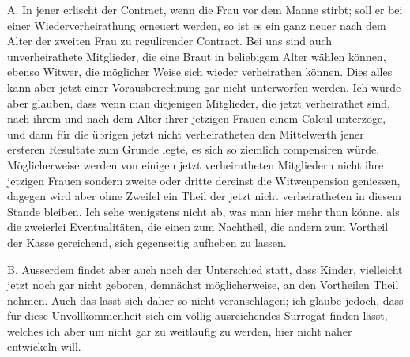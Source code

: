 A. In jener erlischt der Contract, wenn die Frau vor dem Manne stirbt; soll er bei einer Wiederverheirathung erneuert werden, so ist es ein ganz neuer nach dem Alter der zweiten Frau zu regulirender Contract. Bei uns sind auch unverheirathete Mitglieder, die eine Braut in beliebigem Alter wählen können, ebenso Witwer, die möglicher Weise sich wieder verheirathen können. Dies alles kann aber jetzt einer Vorausberechnung gar nicht unterworfen werden. Ich würde aber glauben, dass wenn man diejenigen Mitglieder, die jetzt verheirathet sind, nach ihrem und nach dem Alter ihrer jetzigen Frauen einem Calcül unterzöge, und dann für die übrigen jetzt nicht verheiratheten den Mittelwerth jener ersteren Resultate zum Grunde legte, es sich so ziemlich compensiren würde. Möglicherweise werden von einigen jetzt verheiratheten Mitgliedern nicht ihre jetzigen Frauen sondern zweite oder dritte dereinst die Witwenpension geniessen, dagegen wird aber ohne Zweifel ein Theil der jetzt nicht verheiratheten in diesem Stande bleiben. Ich sehe wenigstens nicht ab, was man hier mehr thun könne, als die zweierlei Eventualitäten, die einen zum Nachtheil, die andern zum Vortheil der Kasse gereichend, sich gegenseitig aufheben zu lassen.

B. Ausserdem findet aber auch noch der Unterschied statt, dass Kinder, vielleicht jetzt noch gar nicht geboren, demnächst möglicherweise, an den Vortheilen Theil nehmen. Auch das lässt sich daher so nicht veranschlagen; ich glaube jedoch, dass für diese Unvollkommenheit sich ein völlig ausreichendes Surrogat finden lässt, welches ich aber um nicht gar zu weitläufig zu werden, hier nicht näher entwickeln will.

